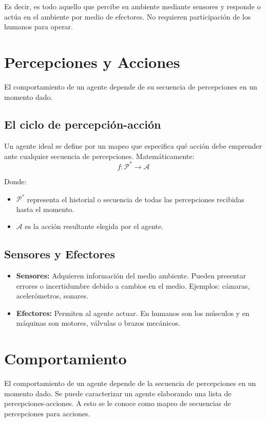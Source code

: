 Es decir, es todo aquello que percibe su ambiente mediante sensores y responde o actúa en el ambiente por medio de efectores. No requieren participación de los humanos para operar.

\section{Percepciones y Acciones}
El comportamiento de un agente depende de su secuencia de percepciones en un momento dado.

\subsection{El ciclo de percepción-acción}
Un agente ideal se define por un mapeo que especifica qué acción debe emprender ante cualquier secuencia de percepciones. Matemáticamente:
\begin{equation*}
    f: \mathcal{P}^* \to \mathcal{A}
\end{equation*}

Donde:
\begin{itemize}
    \item $\mathcal{P}^*$ representa el historial o secuencia de todas las percepciones recibidas hasta el momento.
    \item $\mathcal{A}$ es la acción resultante elegida por el agente.
\end{itemize}

\subsection{Sensores y Efectores}
\begin{itemize}
    \item \textbf{Sensores:} Adquieren información del medio ambiente. Pueden presentar errores o incertidumbre debido a cambios en el medio. Ejemplos: cámaras, acelerómetros, sonares.
    \item \textbf{Efectores:} Permiten al agente actuar. En humanos son los músculos y en máquinas son motores, válvulas o brazos mecánicos.
\end{itemize}

\section{Comportamiento}


El comportamiento de un agente depende de la secuencia de percepciones en un momento dado. Se puede caracterizar un agente elaborando una lista de percepciones-acciones. A esto se le conoce como mapeo de secuencias de percepciones para acciones.

